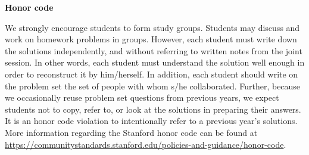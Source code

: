 {\bf Honor code}

We strongly encourage students to form study groups. Students may discuss and
work on homework problems in groups. However, each student must write down the
solutions independently, and without referring to written notes from the joint
session. In other words, each student must understand the solution well enough
in order to reconstruct it by him/herself. In addition, each student should
write on the problem set the set of people with whom s/he collaborated. Further,
because we occasionally reuse problem set questions from previous years, we
expect students not to copy, refer to, or look at the solutions in preparing
their answers. It is an honor code violation to intentionally refer to a
previous year's solutions.  More information regarding the Stanford honor code
can be found at \url{https://communitystandards.stanford.edu/policies-and-guidance/honor-code}.